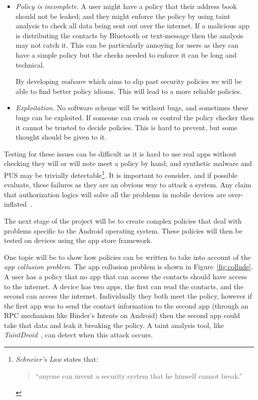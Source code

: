 \documentclass[a4paper]{article}
\begin{document}
\begin{description}
\begin{itemize}
      \item \emph{Policy is incomplete.}  A user might have a policy that their
        address book should not be leaked; and they might enforce the policy by
        using taint analysis to check all data being sent out over the internet.
        If a malicious app is distributing the contacts by Bluetooth or
        text-message then the analysis may not catch it.  This can be
        particularly annoying for users as they can have a simple policy but the
        checks needed to enforce it can be long and technical.

        By developing \emph{malware} which aims to slip past security
        policies we will be able to find better policy idioms.  This will lead
        to a more reliable policies.

      \item \emph{Exploitation.}  No software scheme will be without bugs, and
        sometimes these bugs can be exploited.  If someone can crash or control
        the policy checker then it cannot be trusted to decide policies.
        This is hard to prevent, but some thought should be given to it.
    
    \end{itemize}
  
    Testing for these issues can be difficult as it is hard to use real apps
    without checking they will or will note meet a policy by hand; and synthetic
    malware and \ac{PUS} may be trivially detectable\footnote{\emph{Schneier's
    Law}\cite{Schneier:ws} states that: \begin{quote}``anyone can invent a security
      system that he himself cannot break.''\end{quote}}.  It is important to
    consider, and if possible evaluate, these failures as they are an obvious
    way to attack a system.  Any claim that authorization logics will solve all
    the problems in mobile devices are over-inflated~\cite{Kruger:1999dd}.

\end{description}


The next stage of the project will be to create complex policies that deal with
problems specific to the Android operating system.  These policies will then be
tested on devices using the app store framework.

One topic will be to show how policies can be written to take into account of
the \emph{app collusion problem}.  The app collusion problem is shown in
Figure~\ref{fig:collude}.  A user has a policy that no app that can access the
contacts should have access to the internet.  A device has two apps, the first
can read the contacts, and the second can access the internet.  Individually
they both meet the policy, however if the first app was to send the contact
information to the second app (through an \ac{RPC} mechanism like Binder's
Intents on Android) then the second app could take that data and leak it
breaking the policy.  A taint analysis tool, like
\emph{TaintDroid}~\cite{Enck:2010uw}, can detect when this attack occurs.
\end{document}
